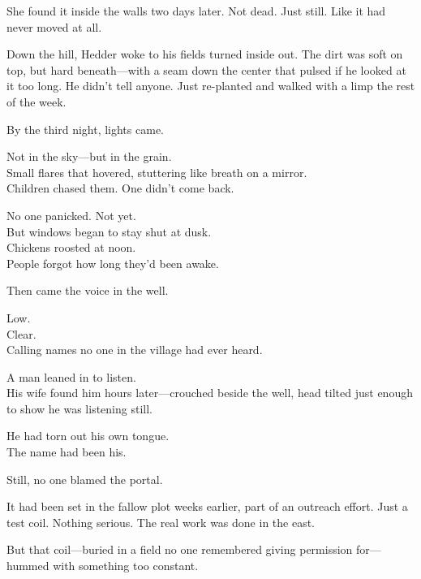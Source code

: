 \documentclass[12pt]{article}
\begin{document}
\vspace{0.5em}
She found it inside the walls two days later. Not dead. Just still. Like it had never moved at all.

\vspace{0.5em}
Down the hill, Hedder woke to his fields turned inside out. The dirt was soft on top, but hard beneath---with a seam down the center that pulsed if he looked at it too long. He didn’t tell anyone. Just re-planted and walked with a limp the rest of the week.

\vspace{0.5em}
By the third night, lights came.

\vspace{0.5em}
Not in the sky---but in the grain.\\
Small flares that hovered, stuttering like breath on a mirror.\\
Children chased them. One didn’t come back.

\vspace{0.5em}
No one panicked. Not yet.\\
But windows began to stay shut at dusk.\\
Chickens roosted at noon.\\
People forgot how long they’d been awake.

\vspace{0.5em}
Then came the voice in the well.

\vspace{0.5em}
Low.\\
Clear.\\
Calling names no one in the village had ever heard.

\vspace{0.5em}
A man leaned in to listen.\\
His wife found him hours later---crouched beside the well, head tilted just enough to show he was listening still.

\vspace{0.5em}
He had torn out his own tongue.\\
The name had been his.

\vspace{0.5em}
Still, no one blamed the portal.

\vspace{0.5em}
It had been set in the fallow plot weeks earlier, part of an outreach effort. Just a test coil. Nothing serious. The real work was done in the east.

\vspace{0.5em}
But that coil---buried in a field no one remembered giving permission for---hummed with something too constant.
\end{document}
